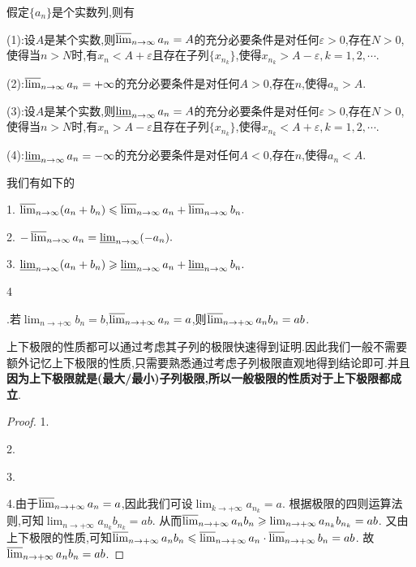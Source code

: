 \documentclass[../../main.tex]{subfiles}
\begin{document}
\begin{proposition}[上下极限的等价定义]\label{proposition:上下极限的等价定义}
假定\(\{a_n\}\)是个实数列,则有

(1):设\(A\)是某个实数,则\(\varlimsup_{n \to \infty} a_n = A\)的充分必要条件是对任何\(\varepsilon > 0\),存在$N>0$,使得当$n>N$时,有$x_n<A+\varepsilon$且存在子列$\{x_{n_k}\}$,使得$x_{n_k}>A-\varepsilon,k=1,2,\cdots$.

(2):\(\varlimsup_{n \to \infty} a_n = +\infty\)的充分必要条件是对任何\(A > 0\),存在\(n\),使得\(a_n > A\).

(3):设\(A\)是某个实数,则\(\varliminf_{n \to \infty} a_n = A\)的充分必要条件是对任何\(\varepsilon > 0\),存在$N>0$,使得当$n>N$时,有$x_n>A-\varepsilon$且存在子列$\{x_{n_k}\}$,使得$x_{n_k}<A+\varepsilon,k=1,2,\cdots$.

(4):\(\varliminf_{n \to \infty} a_n = -\infty\)的充分必要条件是对任何\(A < 0\),存在\(n\),使得\(a_n < A\).
\end{proposition}

\begin{proposition}[上下极限的性质]\label{proposition:上下极限的性质}
我们有如下的

1. $\varlimsup_{n \to \infty} (a_n + b_n) \leqslant  \varlimsup_{n \to \infty} a_n + \varlimsup_{n \to \infty} b_n.$

2. $-\varlimsup_{n \to \infty} a_n = \varliminf_{n \to \infty} (-a_n).$

3. $\varliminf_{n \to \infty} (a_n + b_n) \geqslant  \varliminf_{n \to \infty} a_n + \varliminf_{n \to \infty} b_n.$

\hypertarget{上极限的性质命题(4)}{4}.若\(\lim_{n \to +\infty} b_n = b\),\(\varlimsup_{n \to +\infty} a_n = a\),则\(\varlimsup_{n \to +\infty} a_n b_n = ab\).
\end{proposition}
\begin{note}
上下极限的性质都可以通过考虑其子列的极限快速得到证明.因此我们一般不需要额外记忆上下极限的性质,只需要熟悉通过考虑子列极限直观地得到结论即可.并且\textbf{因为上下极限就是(最大/最小)子列极限,所以一般极限的性质对于上下极限都成立}.
\end{note}
\begin{proof}
1.

2.

3.

4.由于\(\varlimsup_{n \to +\infty} a_n = a\),因此我们可设\(\lim_{k \to +\infty} a_{n_k} = a\).
根据极限的四则运算法则,可知\(\lim_{n \to +\infty} a_{n_k} b_{n_k} = ab\).
从而\(\varlimsup_{n \to +\infty} a_n b_n \geqslant \lim_{n \to +\infty} a_{n_k} b_{n_k} = ab\).
又由上下极限的性质,可知\(\varlimsup_{n \to +\infty} a_n b_n \leqslant \varlimsup_{n \to +\infty} a_n \cdot \varlimsup_{n \to +\infty} b_n = ab\).
故\(\varlimsup_{n \to +\infty} a_n b_n = ab\).

\end{proof}
\end{document}
